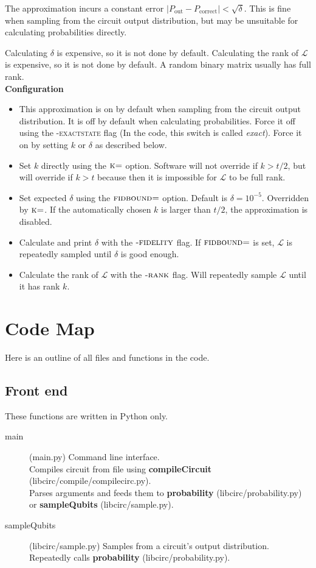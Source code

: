\documentclass[11pt]{article}
\begin{document}
The approximation incurs a constant error $\left|P_\text{out} - P_\text{correct}\right| < \sqrt{\delta}$. This is fine when sampling from the circuit output distribution, but may be unsuitable for calculating probabilities directly.

Calculating $\delta$ is expensive, so it is not done by default. Calculating the rank of $\mathcal{L}$ is expensive, so it is not done by default. A random binary matrix usually has full rank.\\

\noindent \textbf{Configuration}
\begin{itemize}
    \item This approximation is on by default when sampling from the circuit output distribution. It is off by default when calculating probabilities. Force it off using the \textsc{-exactstate} flag (In the code, this switch is called \textit{exact}). Force it on by setting $k$ or $\delta$ as described below.
    \item Set $k$ directly using the $\textsc{k=}$ option. Software will not override if $k > t/2$, but will override if $k>t$ because then it is impossible for $\mathcal{L}$ to be full rank.
    \item Set expected $\delta$ using the $\textsc{fidbound=}$ option. Default is $\delta = 10^{-5}$. Overridden by $\textsc{k=}$. If the automatically chosen $k$ is larger than $t/2$, the approximation is disabled.
    \item Calculate and print $\delta$ with the $\textsc{-fidelity}$ flag. If $\textsc{fidbound=}$ is set, $\mathcal{L}$ is repeatedly sampled until $\delta$ is good enough.
    \item Calculate the rank of $\mathcal{L}$ with the $\textsc{-rank}$ flag. Will repeatedly sample $\mathcal{L}$ until it has rank $k$.
\end{itemize}

\section{Code Map}

Here is an outline of all files and functions in the code.

\subsection{Front end}
These functions are written in Python only.

\begin{description}
    \item[main] (main.py) Command line interface.\\ Compiles circuit from file using \textbf{compileCircuit} (libcirc/compile/compilecirc.py).\\ Parses arguments and feeds them to \textbf{probability} (libcirc/probability.py)\\ or \textbf{sampleQubits} (libcirc/sample.py).
    \item[sampleQubits] (libcirc/sample.py) Samples from a circuit's output distribution.\\
        Repeatedly calls \textbf{probability} (libcirc/probability.py).
\end{description}
\end{document}
